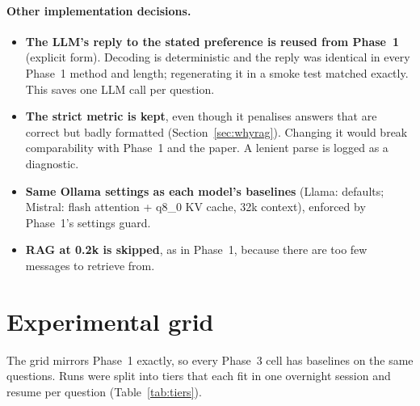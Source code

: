 \documentclass[11pt,a4paper]{article}
\begin{document}
\paragraph{Other implementation decisions.}
\begin{itemize}
  \item \textbf{The LLM's reply to the stated preference is reused from Phase~1} (explicit form). Decoding is deterministic and the reply was
        identical in every Phase~1 method and length; regenerating it in a smoke test matched exactly. This saves one LLM call per question.
  \item \textbf{The strict metric is kept}, even though it penalises answers that are correct but badly formatted (Section~\ref{sec:whyrag}).
        Changing it would break comparability with Phase~1 and the paper. A lenient parse is logged as a diagnostic.
  \item \textbf{Same Ollama settings as each model's baselines} (Llama: defaults; Mistral: flash attention + q8\_0 KV cache, 32k context),
        enforced by Phase~1's settings guard.
  \item \textbf{RAG at 0.2k is skipped}, as in Phase~1, because there are too few messages to retrieve from.
\end{itemize}

\section{Experimental grid}
The grid mirrors Phase~1 exactly, so every Phase~3 cell has baselines on the same questions. Runs were split into tiers that each fit in one
overnight session and resume per question (Table~\ref{tab:tiers}).

\begin{table}[H]
\centering\small
{}
\caption{Runs. Not run: RAG-Gemma alone for Mistral at 10k--23k (optional tier C\_long, about 12\,h).}
\label{tab:tiers}
\end{table}
\end{document}
